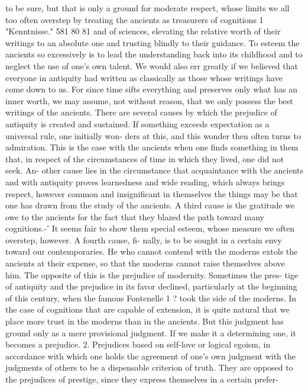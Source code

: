 to be sure, but that is only a ground for moderate respect, whose limits we
all too often overstep by treating the ancients as treasurers of cognitions
1
"Kenntnisse."
581
80
81
and of sciences, elevating the relative worth of their writings to an absolute
one and trusting blindly to their guidance. To esteem the ancients so
excessively is to lead the understanding back into its childhood and to
neglect the use of one's own talent. We would also err greatly if we
believed that everyone in antiquity had written as classically as those
whose writings have come down to us. For since time sifts everything and
preserves only what has an inner worth, we may assume, not without
reason, that we only possess the best writings of the ancients.
There are several causes by which the prejudice of antiquity is created
and sustained.
If something exceeds expectation as a universal rule, one initially won-
ders at this, and this wonder then often turns to admiration. This is the
case with the ancients when one finds something in them that, in respect
of the circumstances of time in which they lived, one did not seek. An-
other cause lies in the circumstance that acquaintance with the ancients
and with antiquity proves learnedness and wide reading, which always
brings respect, however common and insignificant in themselves the
things may be that one has drawn from the study of the ancients. A third
cause is the gratitude we owe to the ancients for the fact that they blazed
the path toward many cognitions.-' It seems fair to show them special
esteem, whose measure we often overstep, however. A fourth cause, fi-
nally, is to be sought in a certain envy toward our contemporaries. He who
cannot contend with the moderns extols the ancients at their expense, so
that the moderns cannot raise themselves above him.
The opposite of this is the prejudice of modernity. Sometimes the pres-
tige of antiquity and the prejudice in its favor declined, particularly at the
beginning of this century, when the famous Fontenelle 1 ? took the side of
the moderns. In the case of cognitions that are capable of extension, it is
quite natural that we place more trust in the moderns than in the ancients.
But this judgment has ground only as a mere provisional judgment. If we
make it a determining one, it becomes a prejudice.
2. Prejudices based on self-love or logical egoism, in accordance with which
one holds the agreement of one's own judgment with the judgments of
others to be a dispensable criterion of truth. They are opposed to the
prejudices of prestige, since they express themselves in a certain prefer-
